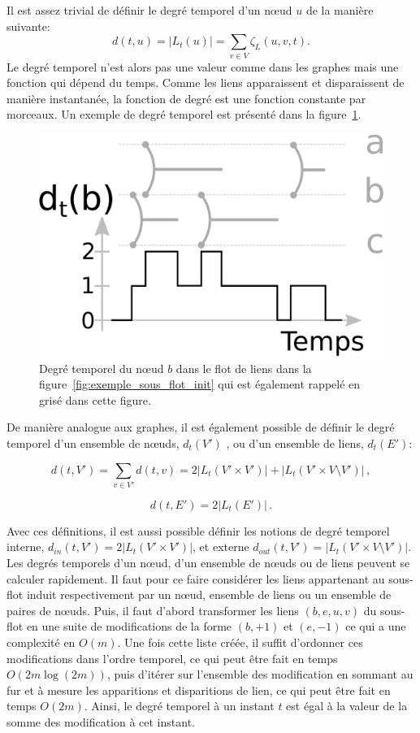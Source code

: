 Il est assez trivial de définir le degré temporel d'un n\oe ud $u$ de la manière suivante:
\begin{equation}
d(t,u)= |L_t(u)|= \sum_{v \in V} \zeta_{L}(u,v,t).
\end{equation}
Le degré temporel n'est alors pas une valeur comme dans les graphes mais une fonction qui dépend du temps.
Comme les liens apparaissent et disparaissent de manière instantanée, la fonction de degré est une fonction constante par morceaux.
Un exemple de degré temporel est présenté dans la figure~\ref{fig:exemple_degre}.

\begin{figure}
\centering
\includegraphics[width=0.35\linewidth]{img/Intro/degre2.eps}
\caption{Degré temporel du n\oe ud $b$ dans le flot de liens dans la figure~\ref{fig:exemple_sous_flot_init} qui est également rappelé en grisé dans cette figure.
}
\label{fig:exemple_degre}
\end{figure}

De manière analogue aux graphes, il est également possible de définir le degré temporel d'un ensemble de n\oe uds, $d_t(V')$ , ou d'un ensemble de liens, $d_t(E')$:

\begin{equation}
d(t, V') = \sum_{v \in V'} d(t,v) = 2 |L_{t}(V'\times V')|+ |L_{t}(V'\times V \setminus V')|\,,
\end{equation}

\begin{equation}
d(t, E')=2|L_{t}(E')| \,.
\end{equation}

Avec ces définitions, il est aussi possible définir les notions de degré temporel interne, $d_{in}(t,V') = 2 |L_{t}(V'\times V')|$, et externe $d_{out}(t,V')=|L_{t}(V'\times V \setminus V')|$.
Les degrés temporels d'un n\oe ud, d'un ensemble de n\oe uds ou de liens peuvent se calculer rapidement.
Il faut pour ce faire considérer les liens appartenant au sous-flot induit respectivement par un n\oe ud, ensemble de liens ou un ensemble de paires de n\oe uds.
Puis, il faut d'abord transformer les liens $(b,e,u,v)$ du sous-flot en une suite de modifications de la forme $(b,+1)$ et $(e,-1)$ ce qui a une complexité en $O(m)$.
Une fois cette liste créée, il suffit d'ordonner ces modifications dans l'ordre temporel, ce qui peut être fait en temps $O(2m\log(2m))$, puis d'itérer sur l'ensemble des modification en sommant au fur et à mesure les apparitions et disparitions de lien, ce qui peut être fait en temps $O(2m)$.
Ainsi, le degré temporel à un instant $t$ est égal à la valeur de la somme des modification à cet instant.
\bigskip

